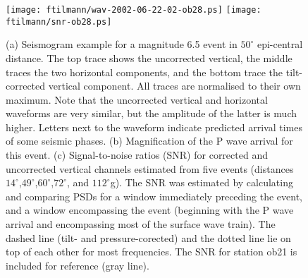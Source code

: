 \documentclass{article}
\renewcommand{\includegraphics}[2][1]{{\sf Figure: {\tt #1}}}
\begin{document}
{%

\begin{figure}
\texttt{[image: ftilmann/wav-2002-06-22-02-ob28.ps]}
\texttt{[image: ftilmann/snr-ob28.ps]}
\caption{(a) Seismogram example for a magnitude 6.5 event in $50^{\circ}$
epi-central distance. The top trace shows the uncorrected vertical,
the middle traces the two horizontal components, and the bottom trace
the tilt-corrected vertical component. All traces are normalised to
their own maximum.  Note that the uncorrected vertical and horizontal
waveforms are very similar, but the amplitude of the latter is much
higher. Letters next to the waveform indicate predicted arrival times
of some seismic phases. (b)  Magnification of the P wave
arrival for this event.  (c) Signal-to-noise ratios (SNR) for corrected and
uncorrected vertical channels estimated from  five
events 
(distances 
$14^{\circ}$,$49^{\circ}$,$60^{\circ}$,$72^{\circ}$, and $112^{\circ}$g). 
The SNR was
estimated by calculating and comparing PSDs for a window
immediately preceding the event, and a window encompassing the event
(beginning with the P wave arrival and encompassing most of the
surface wave train). The dashed line (tilt- and pressure-corected) and
the dotted line lie on top of each other for most frequencies. The SNR
for station ob21 is included for reference (gray line).}
\label{fig:tilt-correction2}
\end{figure}

}
\end{document}
